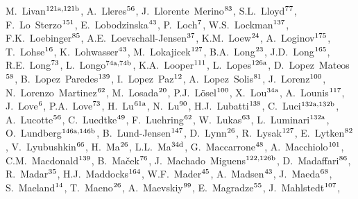 \begin{flushleft}
M.~Livan$^\textrm{\scriptsize 121a,121b}$,
A.~Lleres$^\textrm{\scriptsize 56}$,
J.~Llorente~Merino$^\textrm{\scriptsize 83}$,
S.L.~Lloyd$^\textrm{\scriptsize 77}$,
F.~Lo~Sterzo$^\textrm{\scriptsize 151}$,
E.~Lobodzinska$^\textrm{\scriptsize 43}$,
P.~Loch$^\textrm{\scriptsize 7}$,
W.S.~Lockman$^\textrm{\scriptsize 137}$,
F.K.~Loebinger$^\textrm{\scriptsize 85}$,
A.E.~Loevschall-Jensen$^\textrm{\scriptsize 37}$,
K.M.~Loew$^\textrm{\scriptsize 24}$,
A.~Loginov$^\textrm{\scriptsize 175}$,
T.~Lohse$^\textrm{\scriptsize 16}$,
K.~Lohwasser$^\textrm{\scriptsize 43}$,
M.~Lokajicek$^\textrm{\scriptsize 127}$,
B.A.~Long$^\textrm{\scriptsize 23}$,
J.D.~Long$^\textrm{\scriptsize 165}$,
R.E.~Long$^\textrm{\scriptsize 73}$,
L.~Longo$^\textrm{\scriptsize 74a,74b}$,
K.A.~Looper$^\textrm{\scriptsize 111}$,
L.~Lopes$^\textrm{\scriptsize 126a}$,
D.~Lopez~Mateos$^\textrm{\scriptsize 58}$,
B.~Lopez~Paredes$^\textrm{\scriptsize 139}$,
I.~Lopez~Paz$^\textrm{\scriptsize 12}$,
A.~Lopez~Solis$^\textrm{\scriptsize 81}$,
J.~Lorenz$^\textrm{\scriptsize 100}$,
N.~Lorenzo~Martinez$^\textrm{\scriptsize 62}$,
M.~Losada$^\textrm{\scriptsize 20}$,
P.J.~L{\"o}sel$^\textrm{\scriptsize 100}$,
X.~Lou$^\textrm{\scriptsize 34a}$,
A.~Lounis$^\textrm{\scriptsize 117}$,
J.~Love$^\textrm{\scriptsize 6}$,
P.A.~Love$^\textrm{\scriptsize 73}$,
H.~Lu$^\textrm{\scriptsize 61a}$,
N.~Lu$^\textrm{\scriptsize 90}$,
H.J.~Lubatti$^\textrm{\scriptsize 138}$,
C.~Luci$^\textrm{\scriptsize 132a,132b}$,
A.~Lucotte$^\textrm{\scriptsize 56}$,
C.~Luedtke$^\textrm{\scriptsize 49}$,
F.~Luehring$^\textrm{\scriptsize 62}$,
W.~Lukas$^\textrm{\scriptsize 63}$,
L.~Luminari$^\textrm{\scriptsize 132a}$,
O.~Lundberg$^\textrm{\scriptsize 146a,146b}$,
B.~Lund-Jensen$^\textrm{\scriptsize 147}$,
D.~Lynn$^\textrm{\scriptsize 26}$,
R.~Lysak$^\textrm{\scriptsize 127}$,
E.~Lytken$^\textrm{\scriptsize 82}$,
V.~Lyubushkin$^\textrm{\scriptsize 66}$,
H.~Ma$^\textrm{\scriptsize 26}$,
L.L.~Ma$^\textrm{\scriptsize 34d}$,
G.~Maccarrone$^\textrm{\scriptsize 48}$,
A.~Macchiolo$^\textrm{\scriptsize 101}$,
C.M.~Macdonald$^\textrm{\scriptsize 139}$,
B.~Ma\v{c}ek$^\textrm{\scriptsize 76}$,
J.~Machado~Miguens$^\textrm{\scriptsize 122,126b}$,
D.~Madaffari$^\textrm{\scriptsize 86}$,
R.~Madar$^\textrm{\scriptsize 35}$,
H.J.~Maddocks$^\textrm{\scriptsize 164}$,
W.F.~Mader$^\textrm{\scriptsize 45}$,
A.~Madsen$^\textrm{\scriptsize 43}$,
J.~Maeda$^\textrm{\scriptsize 68}$,
S.~Maeland$^\textrm{\scriptsize 14}$,
T.~Maeno$^\textrm{\scriptsize 26}$,
A.~Maevskiy$^\textrm{\scriptsize 99}$,
E.~Magradze$^\textrm{\scriptsize 55}$,
J.~Mahlstedt$^\textrm{\scriptsize 107}$,

\end{flushleft}
